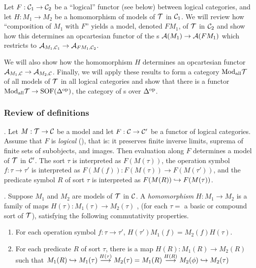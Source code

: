 Let $F : {{\bf \cal C}}_1 \to {{\bf \cal C}}_2$ be a ``logical'' functor (see 
below) between logical categories, and let $H : M_1 \to M_2$ be a 
homomorphism of models of $\cal T$ in ${{\bf \cal C}}_1$. We will review how 
``composition of $M_1$ with $F$'' yields a model, denoted $FM_1$, of 
$\cal T$ in ${{\bf \cal C}}_2$ and show how this determines an opcartesian 
functor of the \SOF s ${\bf \cal A} (M_1) \to {\bf \cal A} (FM_1)$ which restricts 
to ${{\bf \cal A}}_{{M_1},{{\bf \cal C}_1}} \to {{\bf \cal A}}_{{FM_1},{{\bf \cal C}_2}}$. 

We will also show how the homomorphism $H$ determines an opcartesian 
functor ${{\bf \cal A}}_{{M_1},{{\bf \cal C}}} \to {{\bf \cal A}}_{{M_2},{{\bf \cal C}}}$. Finally, we will apply these 
results to form a category $\mbox{Mod}_{\rm all}{\cal T}$ of all 
models of $\cal T$ in all logical categories and show that there is a 
functor $\mbox{Mod}_{\rm all}{\cal T} \to \mbox{SOF}({\Delta^{\rm 
op}})$, the category of \SOF s over $\Delta^{\rm op}$.

\subsubsection{Review of definitions}
\label{REVDEF}

. Let $M : \cal T 
\to {\bf \cal C}$ be a model and let $F : {\bf \cal C} \to {\bf \cal C}'$ be a functor of 
logical categories. Assume that $F$ is {\em logical} (\cite{MR}), 
that is: it preserves finite inverse limits, suprema of finite sets 
of subobjects, and images. Then evaluation along $F$ determines a 
model of $\cal T$ in ${\bf \cal C}'$. The sort $\tau$ is interpreted as 
$F(M(\tau))$, the operation symbol $f : \tau \to \tau'$ is 
interpreted as $F(M(f)) : F(M(\tau)) \to F(M(\tau'))$, and the 
predicate symbol $R$ of sort $\tau$ is interpreted as $F(M(R)) \hookrightarrow 
F(M(\tau))$. \medskip

. Suppose $M_1$ and $M_2$ are models 
of $\cal T$ in ${\bf \cal C}$. A {\em homomorphism} $H : M_1 \to M_2$ is a 
family of maps $H(\tau) : M_1(\tau) \to M_2(\tau)$ , (for each 
$\tau=$ a basic or compound sort of $\cal T$), satisfying the 
following commutativity properties.
\begin{enumerate}

\item For each operation symbol $f : \tau \to \tau'$, $H(\tau') 
M_1(f) = M_2(f) H(\tau)$.

\item For each predicate $R$ of sort $\tau$, there is a map $H(R) : 
M_1(R) \to M_2(R)$ such that $M_1(R) \hookrightarrow M_1(\tau) 
\stackrel{H(\tau)}{\longrightarrow} M_2(\tau) = M_1(R) 
\stackrel{H(R)}{\longrightarrow} M_2(\phi) \hookrightarrow M_2(\tau)$ 

\end{enumerate}

